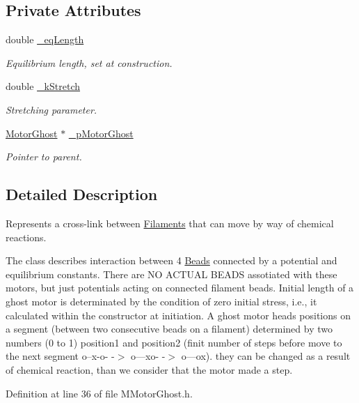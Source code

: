 \subsection*{Private Attributes}
\begin{DoxyCompactItemize}
\item 
double \hyperlink{classMMotorGhost_a1cd86ed356e7b00fbf30de29824e769f}{\+\_\+eq\+Length}
\begin{DoxyCompactList}\small\item\em Equilibrium length, set at construction. \end{DoxyCompactList}\item 
double \hyperlink{classMMotorGhost_ac4dd3bd5770e8e7793b1f1a8413ab9e6}{\+\_\+k\+Stretch}
\begin{DoxyCompactList}\small\item\em Stretching parameter. \end{DoxyCompactList}\item 
\hyperlink{classMotorGhost}{Motor\+Ghost} $\ast$ \hyperlink{classMMotorGhost_a3c22024539ed93368cd83cda70e075a4}{\+\_\+p\+Motor\+Ghost}
\begin{DoxyCompactList}\small\item\em Pointer to parent. \end{DoxyCompactList}\end{DoxyCompactItemize}


\subsection{Detailed Description}
Represents a cross-\/link between \hyperlink{classFilament}{Filaments} that can move by way of chemical reactions. 

The class describes interaction between 4 \hyperlink{classBead}{Beads} connected by a potential and equilibrium constants. There are N\+O A\+C\+T\+U\+A\+L B\+E\+A\+D\+S assotiated with these motors, but just potentials acting on connected filament beads. Initial length of a ghost motor is determinated by the condition of zero initial stress, i.\+e., it calculated within the constructor at initiation. A ghost motor heads positions on a segment (between two consecutive beads on a filament) determined by two numbers (0 to 1) position1 and position2 (finit number of steps before move to the next segment o--x-\/o-\/ -\/$>$ o---xo-\/ -\/$>$ o---ox). they can be changed as a result of chemical reaction, than we consider that the motor made a step. 

Definition at line 36 of file M\+Motor\+Ghost.\+h.



